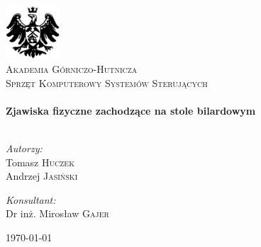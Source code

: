 \begin{titlepage}

\begin{center}

\includegraphics[width=0.15\textwidth]{./img/logo.eps}\\[1cm]

\textsc{\LARGE Akademia Górniczo-Hutnicza}\\[1.5cm]

\textsc{\Large Sprzęt Komputerowy Systemów Sterujących}\\[0.5cm]


\HRule \\[0.4cm]
{ \huge \bfseries Zjawiska fizyczne zachodzące na stole bilardowym}\\[0.4cm]

\HRule \\[1.5cm]

\begin{minipage}{0.4\textwidth}
\begin{flushleft} \large
\emph{Autorzy:}\\
Tomasz \textsc{Huczek}\\
Andrzej \textsc{Jasiński}
\end{flushleft}
\end{minipage}
\begin{minipage}{0.4\textwidth}
\begin{flushright} \large
\emph{Konsultant:} \\
Dr inż. Mirosław \textsc{Gajer}
\end{flushright}
\end{minipage}

\vfill

{\large \today}

\end{center}

\end{titlepage}
